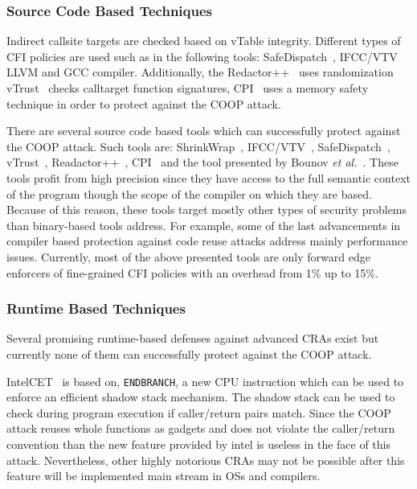 \subsubsection{Source Code Based Techniques} Indirect callsite targets are checked based on vTable integrity.
Different types of CFI policies are used such as in the following tools:
SafeDispatch~\cite{safedispatch:jang}, IFCC/VTV~\cite{vtv:tice} LLVM and GCC compiler.
Additionally, the Redactor++~\cite{crane:readactor++} uses randomization 
vTrust~\cite{zhang:vtrust} checks calltarget function signatures, 
CPI~\cite{volodymyr:cpi} uses a memory safety technique
in order to protect against the COOP attack.

There are several source code based tools 
which can successfully protect against the COOP attack.
Such tools are: ShrinkWrap~\cite{haller:shrinkwrap}, IFCC/VTV~\cite{vtv:tice}, 
SafeDispatch~\cite{safedispatch:jang}, vTrust~\cite{zhang:vtrust}, Readactor++~\cite{crane:readactor++}, CPI~\cite{volodymyr:cpi} and the
tool presented by Bounov \textit{et al.}~\cite{bounov:interleaving}. These tools profit from high precision
since they have access to the full semantic context of the program though the scope
of the compiler on which they are based. 
Because of this reason, these tools target mostly other types of security problems than binary-based 
tools address. For example, some of the last advancements in compiler based protection against code reuse attacks address mainly performance issues.
Currently, most of the above presented tools are only forward edge enforcers of fine-grained CFI policies with an overhead from 1\% up to 15\%.

\subsubsection{Runtime Based Techniques}
Several promising runtime-based defenses against advanced CRAs exist but currently none of them can successfully
protect against the COOP attack.

IntelCET~\cite{intel:cet} is based on, \texttt{ENDBRANCH}, a new CPU instruction which can be used to enforce
an efficient shadow stack mechanism. The shadow stack can be used to check during program execution if caller/return pairs match.
Since the COOP attack reuses whole functions as gadgets and does not violate the caller/return convention than the 
new feature provided by intel is useless in the face of this attack. Nevertheless, other highly notorious CRAs may not be possible
after this feature will be implemented main stream in OSs and compilers.

